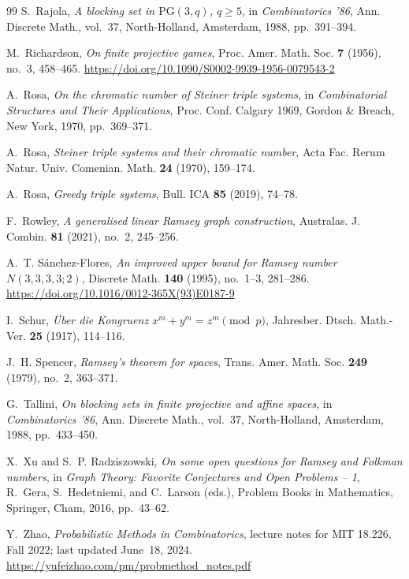\documentclass[11pt]{article}
\theoremstyle{plain}
\begin{document}
\begin{thebibliography}{99}
S.~Rajola,
\emph{A blocking set in $\mathrm{PG}(3,q)$, $q\ge 5$},
in \emph{Combinatorics '86}, Ann. Discrete Math., vol.~37,
North-Holland, Amsterdam, 1988, pp.~391--394.

M.~Richardson,
\emph{On finite projective games},
Proc. Amer. Math. Soc. \textbf{7} (1956), no.~3, 458--465.
\url{https://doi.org/10.1090/S0002-9939-1956-0079543-2}

A.~Rosa,
\emph{On the chromatic number of Steiner triple systems},
in \emph{Combinatorial Structures and Their Applications},
Proc. Conf. Calgary 1969, Gordon \& Breach, New York, 1970, pp.~369--371.

A.~Rosa,
\emph{Steiner triple systems and their chromatic number},
Acta Fac. Rerum Natur. Univ. Comenian. Math. \textbf{24} (1970), 159--174.

A.~Rosa,
\emph{Greedy triple systems},
Bull. ICA \textbf{85} (2019), 74--78.

F.~Rowley,
\emph{A generalised linear Ramsey graph construction},
Australas. J. Combin. \textbf{81} (2021), no.~2, 245--256.

A.~T. S\'anchez-Flores,
\emph{An improved upper bound for Ramsey number $N(3,3,3,3;2)$},
Discrete Math. \textbf{140} (1995), no.~1--3, 281--286.
\url{https://doi.org/10.1016/0012-365X(93)E0187-9}

I.~Schur,
\emph{\"Uber die Kongruenz $x^m+y^m=z^m \pmod p$},
Jahresber. Dtsch. Math.-Ver. \textbf{25} (1917), 114--116.

J.~H. Spencer,
\emph{Ramsey's theorem for spaces},
Trans. Amer. Math. Soc. \textbf{249} (1979), no.~2, 363--371.

G.~Tallini,
\emph{On blocking sets in finite projective and affine spaces},
in \emph{Combinatorics '86}, Ann. Discrete Math., vol.~37,
North-Holland, Amsterdam, 1988, pp.~433--450.

X.~Xu and S.~P. Radziszowski,
\emph{On some open questions for Ramsey and Folkman numbers},
in \emph{Graph Theory: Favorite Conjectures and Open Problems -- 1},
R.~Gera, S.~Hedetniemi, and C.~Larson (eds.),
Problem Books in Mathematics, Springer, Cham, 2016, pp.~43--62.

Y.~Zhao,
\emph{Probabilistic Methods in Combinatorics},
lecture notes for MIT 18.226, Fall 2022; last updated June~18, 2024.
\url{https://yufeizhao.com/pm/probmethod_notes.pdf}

\end{thebibliography}
\end{document}
